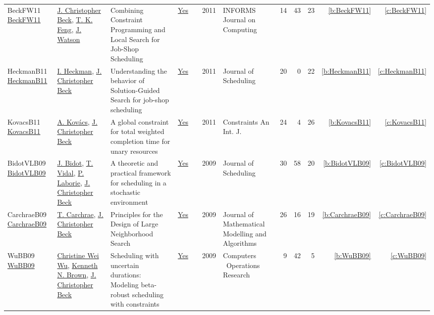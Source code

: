 {\begin{longtable}{>{\raggedright\arraybackslash}p{3cm}>{\raggedright\arraybackslash}p{6cm}>{\raggedright\arraybackslash}p{6.5cm}rrrp{2.5cm}rrrrr}
BeckFW11 \href{https://doi.org/10.1287/ijoc.1100.0388}{BeckFW11} & \hyperref[auth:a89]{J. Christopher Beck}, \hyperref[auth:a834]{T. K. Feng}, \hyperref[auth:a366]{J. Watson} & Combining Constraint Programming and Local Search for Job-Shop Scheduling & \href{works/BeckFW11.pdf}{Yes} & \cite{BeckFW11} & 2011 & INFORMS Journal on Computing & 14 & 43 & 23 & \ref{b:BeckFW11} & \ref{c:BeckFW11}\\
HeckmanB11 \href{https://doi.org/10.1007/s10951-009-0113-0}{HeckmanB11} & \hyperref[auth:a835]{I. Heckman}, \hyperref[auth:a89]{J. Christopher Beck} & Understanding the behavior of Solution-Guided Search for job-shop scheduling & \href{works/HeckmanB11.pdf}{Yes} & \cite{HeckmanB11} & 2011 & Journal of Scheduling & 20 & 0 & 22 & \ref{b:HeckmanB11} & \ref{c:HeckmanB11}\\
KovacsB11 \href{https://doi.org/10.1007/s10601-009-9088-x}{KovacsB11} & \hyperref[auth:a147]{A. Kov{\'{a}}cs}, \hyperref[auth:a89]{J. Christopher Beck} & A global constraint for total weighted completion time for unary resources & \href{works/KovacsB11.pdf}{Yes} & \cite{KovacsB11} & 2011 & Constraints An Int. J. & 24 & 4 & 26 & \ref{b:KovacsB11} & \ref{c:KovacsB11}\\
BidotVLB09 \href{https://doi.org/10.1007/s10951-008-0080-x}{BidotVLB09} & \hyperref[auth:a836]{J. Bidot}, \hyperref[auth:a837]{T. Vidal}, \hyperref[auth:a118]{P. Laborie}, \hyperref[auth:a89]{J. Christopher Beck} & A theoretic and practical framework for scheduling in a stochastic environment & \href{works/BidotVLB09.pdf}{Yes} & \cite{BidotVLB09} & 2009 & Journal of Scheduling & 30 & 58 & 20 & \ref{b:BidotVLB09} & \ref{c:BidotVLB09}\\
CarchraeB09 \href{http://dx.doi.org/10.1007/s10852-008-9100-2}{CarchraeB09} & \hyperref[auth:a275]{T. Carchrae}, \hyperref[auth:a89]{J. Christopher Beck} & Principles for the Design of Large Neighborhood Search & \href{works/CarchraeB09.pdf}{Yes} & \cite{CarchraeB09} & 2009 & Journal of Mathematical Modelling and Algorithms & 26 & 16 & 19 & \ref{b:CarchraeB09} & \ref{c:CarchraeB09}\\
WuBB09 \href{https://doi.org/10.1016/j.cor.2008.08.008}{WuBB09} & \hyperref[auth:a277]{Christine Wei Wu}, \hyperref[auth:a223]{Kenneth N. Brown}, \hyperref[auth:a89]{J. Christopher Beck} & Scheduling with uncertain durations: Modeling beta-robust scheduling with constraints & \href{works/WuBB09.pdf}{Yes} & \cite{WuBB09} & 2009 & Computers \  Operations Research & 9 & 42 & 5 & \ref{b:WuBB09} & \ref{c:WuBB09}\\

\end{longtable}}
